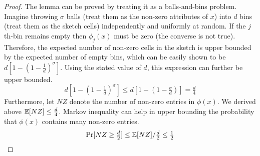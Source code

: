 \begin{proof}
The lemma can be proved by treating it as a balls-and-bins problem. Imagine
    throwing $\sigma$ balls (treat them as the non-zero attributes of $x$) into
    $d$ bins (treat them as the sketch cells) independently and uniformly at
    random. If the $j$th-bin remains empty then $\phi_j(x)$ must be zero (the
    converse is not true). Therefore, the expected number of non-zero cells in the
    sketch is upper bounded by the expected number of empty bins, which can be
    easily shown to be $d[1-(1-\tfrac{1}{d})^\sigma]$. Using the stated value of
    $d$, this expression can further be upper bounded.
    $$d[1-(1-\tfrac{1}{d})^\sigma] \le d[1-(1-\tfrac{\sigma}{d})] =
    \tfrac{d}{4}$$
    Furthermore, let $NZ$ denote the number of non-zero entries in $\phi(x)$. We
    derived above $\mathbb{E}[NZ] \le \tfrac{d}{4}$. Markov inequality can help in upper
    bounding the probability that $\phi(x)$ contains many non-zero entries.
    $$\Pr[NZ \ge \tfrac{d}{2}] \le \mathbb{E}[NZ]/\tfrac{d}{2} \le \tfrac{1}{2}$$
\end{proof}

